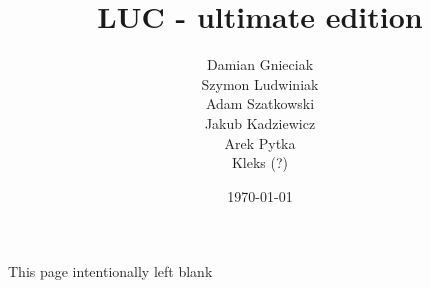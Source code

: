 \documentclass[titlepage]{article}
\title{LUC - ultimate edition}
\date{\today}
\author{Damian Gnieciak \\ Szymon Ludwiniak \\ Adam Szatkowski \\ Jakub Kadziewicz \\ Arek Pytka \\ Kleks (?)}
\begin{document}
\begin{titlepage} 
    \maketitle 
\end{titlepage}

\newpage

\tableofcontents

\newpage

\hspace{0px}
\vfill
    \begin{center}
        This page intentionally left blank
    \end{center}
\vfill

\newpage



\newpage



\newpage



\newpage



\newpage



\newpage



\newpage



\newpage



\newpage



\newpage



\newpage


\end{document}
